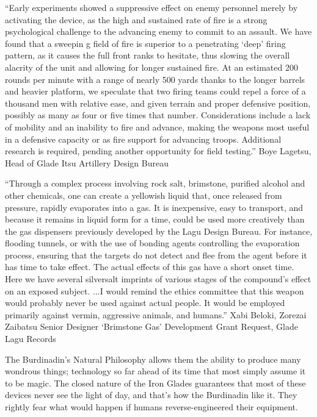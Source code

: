 \documentclass[oneside,11pt,english]{book}
\begin{document}
 

“Early experiments showed a suppressive effect on enemy personnel merely by activating the device, as the high and sustained 
rate of fire is a strong psychological challenge to the advancing enemy to commit to an assault. We have found that a sweepin g 
field of fire is superior to a penetrating ‘deep’ firing pattern, as it causes the full front ranks to hesitate, thus slowing the overall 
alacrity of the unit and allowing for longer sustained fire. At an estimated 200 rounds per minute with a range of nearly 500 
yards thanks to the longer barrels and heavier platform, we speculate that two firing teams could repel a force of a thousand men 
with relative ease, and given terrain and proper defensive position, possibly as many as four or five times that number. 
Considerations include a lack of mobility and an inability to fire and advance, making the weapons most useful in a defensive 
capacity or as fire support for advancing troops. Additional research is required, pending another opportunity for field testing.” 
Boye Lagetsu, Head of Glade Itsu Artillery Design Bureau 

 

“Through a complex process involving rock salt, brimstone, purified alcohol and other chemicals, one can create a yellowish 
liquid that, once released from pressure, rapidly evaporates into a gas. It is inexpensive, easy to transport, and because it 
remains in liquid form for a time, could be used more creatively than the gas dispensers previously developed by the Lagu Design 
Bureau. For instance, flooding tunnels, or with the use of bonding agents controlling the evaporation process, ensuring that the 
targets do not detect and flee from the agent before it has time to take effect. The actual effects of this gas have a short onset time. 
Here we have several silversalt imprints of various stages of the compound’s effect on an exposed subject. 
...I would remind the ethics committee that this weapon would probably never be used against actual people. It would be 
employed primarily against vermin, aggressive animals, and humans.” 
Xabi Beloki, Zorezai Zaibatsu Senior Designer 
‘Brimstone Gas’ Development Grant Request, Glade Lagu Records 

 

The Burdinadin’s Natural Philosophy allows them the ability to produce many wondrous things; 
technology so far ahead of its time that most simply assume it to be magic. The closed nature of the Iron 
Glades guarantees that most of these devices never see the light of day, and that’s how the Burdinadin 
like it. They rightly fear what would happen if humans reverse-engineered their equipment. 
\end{document}
